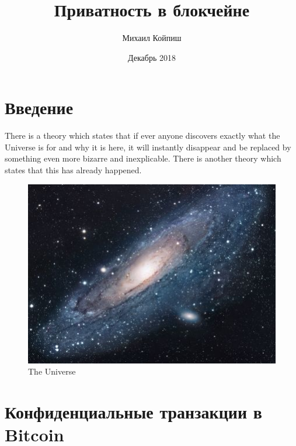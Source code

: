 \documentclass{article}
\title{Приватность в блокчейне}
\author{Михаил Койпиш }
\date{Декабрь 2018}
\begin{document}
\maketitle

\section{Введение}
There is a theory which states that if ever anyone discovers exactly what the Universe is for and why it is here, it will instantly disappear and be replaced by something even more bizarre and inexplicable.
There is another theory which states that this has already happened.

\begin{figure}[h!]
\centering
\includegraphics[scale=1.7]{universe}
\caption{The Universe}
\label{fig:universe}
\end{figure}

\section{Конфиденциальные транзакции в Bitcoin}
\end{document}
